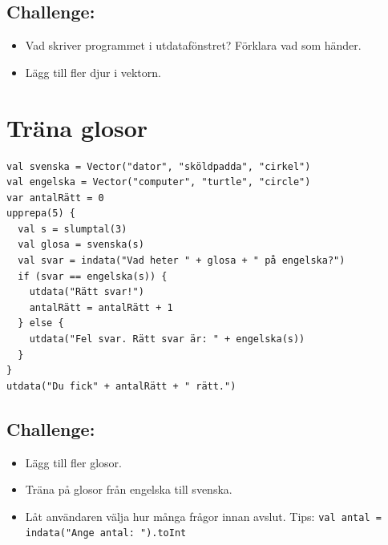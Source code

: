 \section*{\color{BrickRed}Challenge:}


\begin{itemize}

\item {Vad skriver programmet i utdatafönstret? Förklara vad som händer.}
\item {Lägg till fler djur i vektorn.}

\end{itemize}


\chapter{Träna glosor}
\begin{lstlisting}[basicstyle={\ttfamily\fontsize{14}{17}\selectfont},numbers=none]
val svenska = Vector("dator", "sköldpadda", "cirkel")
val engelska = Vector("computer", "turtle", "circle")
var antalRätt = 0
upprepa(5) {
  val s = slumptal(3)
  val glosa = svenska(s)
  val svar = indata("Vad heter " + glosa + " på engelska?")
  if (svar == engelska(s)) {
    utdata("Rätt svar!")
    antalRätt = antalRätt + 1
  } else {
    utdata("Fel svar. Rätt svar är: " + engelska(s))
  }
}
utdata("Du fick" + antalRätt + " rätt.")
\end{lstlisting}
        
\section*{\color{BrickRed}Challenge:}


\begin{itemize}

\item {Lägg till fler glosor.}
\item {Träna på glosor från engelska till svenska.}
\item {Låt användaren välja hur många frågor innan avslut. Tips: \lstinline{val antal = indata("Ange antal: ").toInt}}

\end{itemize}


